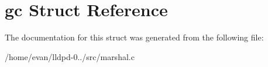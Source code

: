 \section{gc \-Struct \-Reference}
\label{structgc}


\-The documentation for this struct was generated from the following file\-:\begin{DoxyCompactItemize}
\item 
/home/evan/lldpd-\/0../src/marshal.\-c\end{DoxyCompactItemize}
